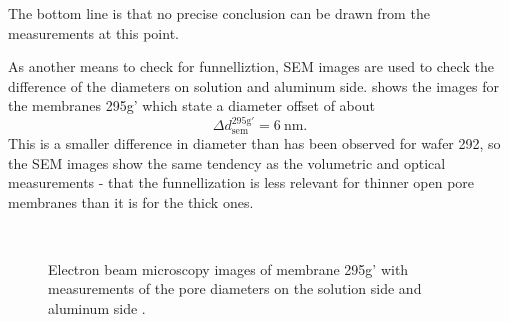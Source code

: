 \documentclass[../thesis.tex]{subfiles}
\begin{document}
    The bottom line is that no precise conclusion can be drawn from the measurements at this point.
    \medskip

    As another means to check for funnelliztion, SEM images are used to check the difference of the diameters on solution and aluminum side.  shows the images for the membranes 295g' which state a diameter offset of about
    \begin{equation*}
        \Delta d_\mathrm{sem}^\mathrm{295g'}=\SI{6}{\nano\meter}.
    \end{equation*}
    This is a smaller difference in diameter than has been observed for wafer 292, so the SEM images show the same tendency as the volumetric and optical measurements - that the funnellization is less relevant for thinner open pore membranes than it is for the thick ones.
    \medskip

    \begin{figure}[p]
      \centering
      \\
      \caption{Electron beam microscopy images of membrane 295g' with measurements of the pore diameters on the solution side \protect{} and aluminum side \protect{}.}
      \label{fig:meb-funnelling}
    \end{figure}
\end{document}
